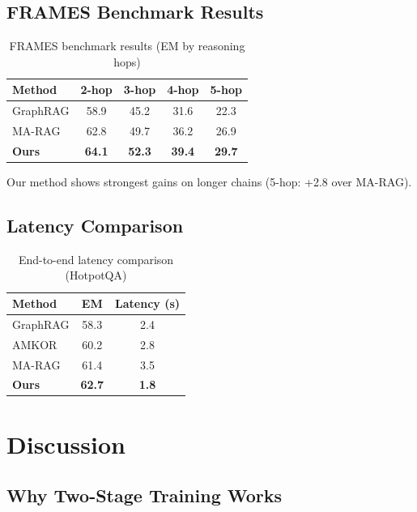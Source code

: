 \documentclass[10pt,twocolumn]{article}
\begin{document}
\subsection{FRAMES Benchmark Results}
\label{sec:frames}

\begin{table}[h]
\centering
\caption{FRAMES benchmark results (EM by reasoning hops)}
\label{tab:frames}
\small
\begin{tabular}{@{}lcccc@{}}
\toprule
\textbf{Method} & \textbf{2-hop} & \textbf{3-hop} & \textbf{4-hop} & \textbf{5-hop} \\
\midrule
GraphRAG & 58.9 & 45.2 & 31.6 & 22.3 \\
MA-RAG & 62.8 & 49.7 & 36.2 & 26.9 \\
\midrule
\textbf{Ours} & \textbf{64.1} & \textbf{52.3} & \textbf{39.4} & \textbf{29.7} \\
\bottomrule
\end{tabular}
\end{table}

Our method shows strongest gains on longer chains (5-hop: +2.8 over MA-RAG).


\subsection{Latency Comparison}

\begin{table}[h]
\centering
\caption{End-to-end latency comparison (HotpotQA)}
\label{tab:latency}
\small
\begin{tabular}{@{}lcc@{}}
\toprule
\textbf{Method} & \textbf{EM} & \textbf{Latency (s)} \\
\midrule
GraphRAG & 58.3 & 2.4 \\
AMKOR & 60.2 & 2.8 \\
MA-RAG & 61.4 & 3.5 \\
\midrule
\textbf{Ours} & \textbf{62.7} & \textbf{1.8} \\
\bottomrule
\end{tabular}
\end{table}


\section{Discussion}

\subsection{Why Two-Stage Training Works}
\end{document}
